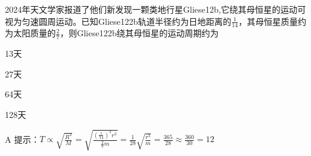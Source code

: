 2024年天文学家报道了他们新发现一颗类地行星Gliese12b,它绕其母恒星的运动可视为匀速圆周运动。已知Gliese122b轨道半径约为日地距离的\(\frac{1}{14}\)，其母恒星质量约为太阳质量的\(\frac{2}{7}\)，则Gliese122b绕其母恒星的运动周期约为\paren[]
\begin{choices}
	\item 13天
	\item 27天
	\item 64天
	\item 128天
\end{choices}
\begin{answer}
	A \qquad 提示：\(T\propto \sqrt{\frac{R^3}{M}} = \sqrt{\frac{(\frac{1}{14})^3r^3}{\frac{2}{7}m}} = \frac{1}{28}\sqrt{\frac{r^3}{m}} =\frac{365}{28}\approx \frac{360}{30} = 12\)
\end{answer}